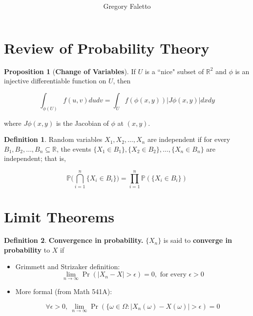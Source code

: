 \documentclass{article}
\title{
    \vspace{2in}
    \textmd{\textbf{ \hmwkTitle}}\\
}
\author{Gregory Faletto}
\date{}
\theoremstyle{definition}
\theoremstyle{definition}
\newtheorem{proposition}[theorem]{Proposition}
\theoremstyle{definition}
\theoremstyle{definition}
\theoremstyle{definition}
\newtheorem{definition}{Definition}[section]
\theoremstyle{definition}
\theoremstyle{definition}
\begin{document}
\maketitle

\pagebreak


%
%



\newpage
%


\section{Review of Probability Theory}

\begin{proposition}[\textbf{Change of Variables}]If \(U\) is a ``nice" subset of \(\mathbb{R}^2\) and \(\phi\) is an injective differentiable function on \(U\), then 

\[
 \int_{\phi(U)} f(u,v) dudv = \int_U f(\phi(x,y)) | J \phi(x,y) | dx dy
\]

where \( J \phi(x,y)\) is the Jacobian of \(\phi\) at \((x,y)\).

\end{proposition}

\begin{definition}Random variables \(X_1, X_2, \ldots, X_n\) are independent if for every \(B_1, B_2, \ldots, B_n \subseteq \mathbb{R}\), the events \(\{X_1 \in B_1\}, \{X_2 \in B_2\}, \ldots, \{X_n \in B_n\} \) are independent; that is, 

\[
\mathbb{P} \bigg( \bigcap_{i=1}^n \{X_i \in B_i\} \bigg) = \prod_{i=1}^n \mathbb{P}(\{X_i \in B_i\})
\]

\end{definition}

\section{Limit Theorems}

\begin{definition} \textbf{Convergence in probability.} \(\{X_n\}\) is said to \textbf{converge in probability} to \(X\) if
\begin{itemize}

\item Grimmett and Strizaker definition:
\[
\lim_{n \to \infty} \Pr(|X_n -X| > \epsilon) = 0, \text{ for every } \epsilon > 0
\]

\item More formal (from Math 541A):

\[
\forall \epsilon > 0, \ \lim_{n \to \infty} \Pr(\{\omega \in \Omega : |X_n(\omega) - X(\omega)| > \epsilon) = 0
\]

\end{itemize}

\end{definition} 
\end{document}
